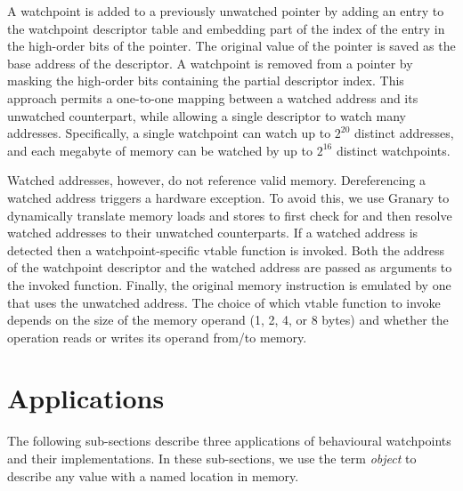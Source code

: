 \documentclass[letterpaper,twocolumn,10pt]{article}
\begin{document}

A watchpoint is added to a previously unwatched pointer by adding an entry to the watchpoint descriptor table and embedding part of the index of the entry in the high-order bits of the pointer. The original value of the pointer is saved as the base address of the descriptor. A watchpoint is removed from a pointer by masking the high-order bits containing the partial descriptor index. This approach permits a one-to-one mapping between a watched address and its unwatched counterpart, while allowing a single descriptor to watch many addresses. Specifically, a single watchpoint can watch up to $2^{20}$ distinct addresses, and each megabyte of memory can be watched by up to $2^{16}$ distinct watchpoints.


Watched addresses, however, do not reference valid memory. Dereferencing a watched address triggers a hardware exception. To avoid this, we use Granary to dynamically translate memory loads and stores to first check for and then resolve watched addresses to their unwatched counterparts. If a watched address is detected then a watchpoint-specific vtable function is invoked. Both the address of the watchpoint descriptor and the watched address are passed as arguments to the invoked function. Finally, the original memory instruction is emulated by one that uses the unwatched address. The choice of which vtable function to invoke depends on the size of the memory operand (1, 2, 4, or 8 bytes) and whether the operation reads or writes its operand from/to memory.


\section{Applications\label{sec:applications}}
The following sub-sections describe three applications of behavioural watchpoints and their implementations. In these sub-sections, we use the term \emph{object} to describe any value with a named location in memory.
\end{document}
